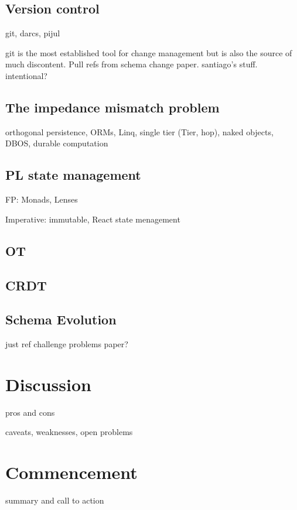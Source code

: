 \documentclass[english,submission]{programming}
\theoremstyle{definition}
\begin{document}
\subsection{Version control}\label{VC}

git, darcs, pijul

git is the most established tool for change management but is also the source of much discontent. Pull refs from schema change paper. santiago's stuff. intentional?

\subsection{The impedance mismatch problem} \label{impedance}

orthogonal persistence, ORMs, Linq, single tier (Tier, hop), naked objects, DBOS, durable computation

\subsection{PL state management}\label{PLstate}

FP: Monads, Lenses

Imperative: immutable, React state menagement

\subsection{OT}\label{OT}

\subsection{CRDT}\label{CRDT}

\subsection{Schema Evolution}\label{schema}
just ref challenge problems paper?



\section{Discussion}
pros and cons

caveats, weaknesses, open problems

\section{Commencement}
summary and call to action

\printbibliography
\end{document}
